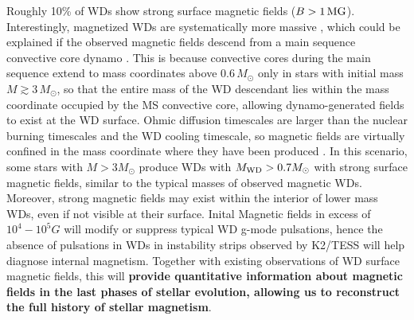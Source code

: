 
Roughly 10\% of WDs show strong surface magnetic fields ($B > 1 \, {\rm MG}$).
Interestingly, magnetized WDs are systematically more massive \cite{Ferrario_2015}, which could be explained if the observed magnetic fields descend from a main sequence convective core dynamo \cite{Cantiello_2016}. This is because convective cores during the main sequence extend to mass coordinates above $0.6 \, M_\odot$ only in stars with initial mass $M \! \gtrsim \! 3 \, M_\odot$, so that the entire mass of the WD descendant lies within the mass coordinate occupied by the MS convective core, allowing dynamo-generated fields to exist at the WD surface. {\color{green} Ohmic diffusion timescales are larger than the nuclear burning timescales and the WD cooling timescale, so magnetic fields are virtually confined in the mass coordinate where they have been produced \cite{Cantiello_2016}.} In this scenario, some stars with $M>3M_\odot$ produce WDs with $M_{\rm WD}>0.7M_\odot$ with strong surface magnetic fields, similar to the typical masses of observed magnetic WDs. Moreover, strong magnetic fields may exist within the interior of lower mass WDs, even if not visible at their surface. Inital Magnetic fields in excess of $10^4-10^5 G$ will modify or suppress typical WD g-mode pulsations, hence the absence of pulsations in WDs in instability strips observed by K2/TESS will help diagnose internal magnetism. Together with existing observations of WD surface magnetic fields, this will \textbf{provide quantitative information about magnetic fields in the last phases of stellar evolution, allowing us to reconstruct the full history of stellar magnetism}.